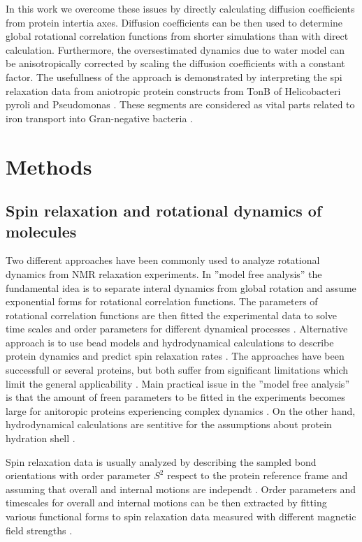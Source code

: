 \documentclass[pre,aps,floatfix,authordate1-4,twocolumn]{revtex4-1}
\begin{document}
In this work we overcome these issues by directly calculating diffusion
coefficients from protein intertia axes. Diffusion coefficients can be then
used to determine global rotational correlation functions from shorter simulations
than with direct calculation. Furthermore, the oversestimated dynamics due to water model
can be anisotropically corrected by scaling the diffusion coefficients with a constant
factor. The usefullness of the approach is demonstrated by interpreting the
spi relaxation data from aniotropic protein constructs from TonB
of Helicobacteri pyroli \cite{??} and Pseudomonas \cite{??}.
These segments are considered as vital parts related to iron transport
into Gran-negative bacteria \cite{??}.


\section{Methods}

\subsection{Spin relaxation and rotational dynamics of molecules}

Two different approaches have been commonly used to analyze
rotational dynamics from NMR relaxation experiments. In
''model free analysis'' the fundamental idea is to separate
interal dynamics from global rotation and assume exponential
forms for rotational correlation functions. The parameters of
rotational correlation functions are then fitted the experimental
data to solve time scales and order parameters for different dynamical
processes \cite{??}. Alternative approach is to use bead models and hydrodynamical
calculations to describe protein dynamics and predict spin relaxation rates \cite{??}.
The approaches have been successfull or several proteins, but both suffer
from significant limitations which limit the general applicability \cite{??}.
Main practical issue in the ''model free analysis'' is that the amount of
freen parameters to be fitted in the experiments becomes large for anitoropic
proteins experiencing complex dynamics \cite{??}. On the other hand,
hydrodynamical calculations are sentitive for the assumptions about
protein hydration shell \cite{??}.


Spin relaxation data is usually analyzed by describing the sampled bond
orientations with order parameter $S^2$ respect to the protein reference frame
and assuming that overall and internal motions are independt \cite{??,korzhnev01}.
Order parameters and timescales for overall and internal motions can be then
extracted by fitting various functional forms to spin relaxation data
measured with different magnetic field strengths \cite{jarymowycz06,korzhnev01}.
\end{document}
